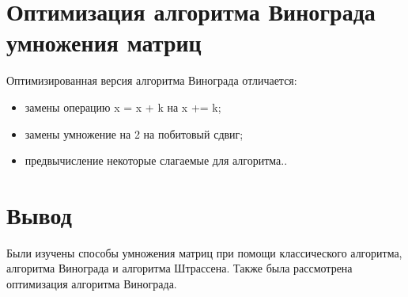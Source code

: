 \section{Оптимизация алгоритма Винограда умножения матриц}

Оптимизированная версия алгоритма Винограда \cite{alg} отличается:

\begin{itemize}
	\item замены операцию x = x + k на x += k;
	\item замены умножение на 2 на побитовый сдвиг;
	\item предвычисление некоторые слагаемые для алгоритма..
\end{itemize}

\section{Вывод}

Были изучены способы умножения матриц при помощи классического алгоритма, алгоритма Винограда и алгоритма Штрассена. Также была рассмотрена оптимизация алгоритма Винограда.